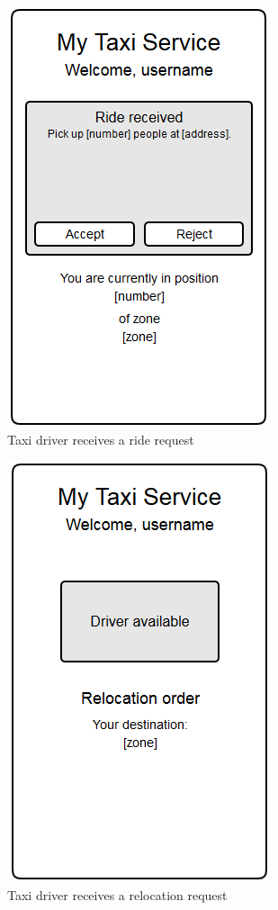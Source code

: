 \begin{figure}
\centering
\includegraphics{tex-images/ui-driver-ride}
\caption{Taxi driver receives a ride request}
\end{figure}

\begin{figure}
\centering
\includegraphics{tex-images/ui-driver-relocation}
\caption{Taxi driver receives a relocation request}
\end{figure}

\cleardoublepage